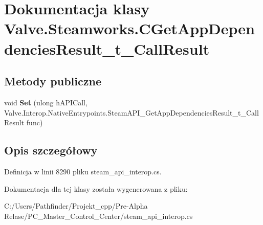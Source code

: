 \hypertarget{class_valve_1_1_steamworks_1_1_c_get_app_dependencies_result__t___call_result}{}\section{Dokumentacja klasy Valve.\+Steamworks.\+C\+Get\+App\+Dependencies\+Result\+\_\+t\+\_\+\+Call\+Result}
\label{class_valve_1_1_steamworks_1_1_c_get_app_dependencies_result__t___call_result}
\subsection*{Metody publiczne}
\begin{DoxyCompactItemize}
\item 
\mbox{\label{class_valve_1_1_steamworks_1_1_c_get_app_dependencies_result__t___call_result_aebbc1cc95c80954bd47053f87ef5a42b}} 
void {\bfseries Set} (ulong h\+A\+P\+I\+Call, Valve.\+Interop.\+Native\+Entrypoints.\+Steam\+A\+P\+I\+\_\+\+Get\+App\+Dependencies\+Result\+\_\+t\+\_\+\+Call\+Result func)
\end{DoxyCompactItemize}


\subsection{Opis szczegółowy}


Definicja w linii 8290 pliku steam\+\_\+api\+\_\+interop.\+cs.



Dokumentacja dla tej klasy została wygenerowana z pliku\+:\begin{DoxyCompactItemize}
\item 
C\+:/\+Users/\+Pathfinder/\+Projekt\+\_\+cpp/\+Pre-\/\+Alpha Relase/\+P\+C\+\_\+\+Master\+\_\+\+Control\+\_\+\+Center/steam\+\_\+api\+\_\+interop.\+cs\end{DoxyCompactItemize}
